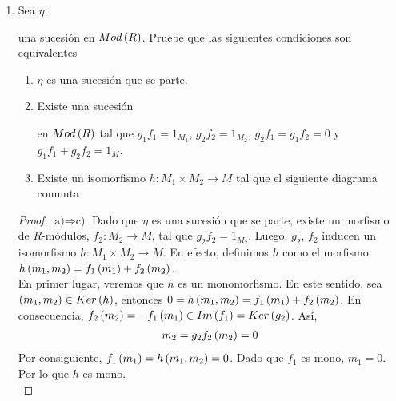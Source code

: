 \documentclass{article}
\begin{document}
\begin{enumerate}[label=\textbf{Ej \arabic*.}]
	\item Sea $\eta:$
	una sucesión en $Mod\left(R\right)$. Pruebe que las siguientes condiciones son equivalentes
	\begin{enumerate}
		\item $\eta$ es una sucesión que se parte.
		\item Existe una sucesión
		en $Mod\left(R\right)$ tal que $g_{1}f_{1}=1_{M_{1}}$, $g_{2}f_{2}=1_{M_{2}}$, $g_{2}f_{1}=g_{1}f_{2}=0$ y $g_{1}f_{1}+g_{2}f_{2}=1_{M}$.
		\item Existe un isomorfismo $h:M_{1} \times M_{2} \longrightarrow M$ tal que el siguiente diagrama conmuta\\
	\end{enumerate}
	\begin{proof}
		$\boxed{\text{a)}\Rightarrow\text{c)}}$ Dado que $\eta$ es una sucesión que se parte, existe un morfismo de $R$-módulos, $f_{2}:M_{2} \longrightarrow M$, tal que $g_{2}f_{2}=1_{M_{2}}$. Luego, $g_{2}$, $f_{2}$ inducen un isomorfismo $h:M_{1} \times M_{2} \longrightarrow M$. En efecto, definimos $h$ como el morfismo $h\left(m_{1},m_{2}\right)=f_{1}\left(m_{1}\right)+f_{2}\left(m_{2}\right)$.\\
		
		En primer lugar, veremos que $h$ es un monomorfismo. En este sentido, sea $\left(m_{1},m_{2}\right) \in Ker\left(h\right)$, entonces $0=h\left(m_{1},m_{2}\right)=f_{1}\left(m_{1}\right)+f_{2}\left(m_{2}\right)$. En consecuencia, $f_{2}\left(m_{2}\right)=-f_{1}\left(m_{1}\right)\in Im\left(f_{1}\right)=Ker\left(g_{2}\right)$. Así, 
		\begin{align*}
			m_{2}=g_{2}f_{2}\left(m_{2}\right)=0
		\end{align*}
		Por consiguiente, $f_{1}\left(m_{1}\right)=h\left(m_{1},m_{2}\right)=0$. Dado que $f_{1}$ es mono, $m_{1}=0$. Por lo que $h$ es mono.\\
		

\end{proof}
\end{enumerate}
\end{document}
